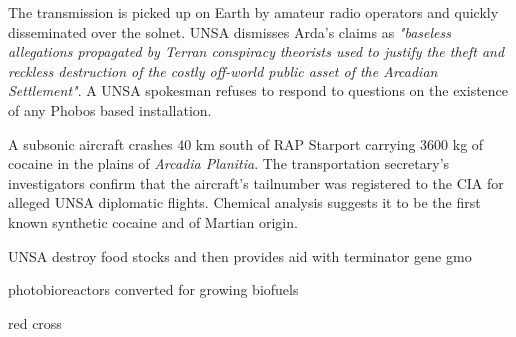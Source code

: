 The transmission is picked up on Earth by amateur radio operators and quickly disseminated over the solnet. UNSA dismisses Arda's claims as {\it "baseless allegations propagated by Terran conspiracy theorists used to justify the theft and reckless destruction of the costly off-world public asset of the Arcadian Settlement"}. A UNSA spokesman refuses to respond to questions on the existence of any Phobos based installation.
\StopTimelineDate

A subsonic aircraft crashes 40 km south of RAP Starport carrying 3600 kg of cocaine in the plains of {\it Arcadia Planitia}. The transportation secretary's investigators confirm that the aircraft's tailnumber was registered to the CIA for alleged UNSA diplomatic flights. Chemical analysis suggests it to be the first known synthetic cocaine and of Martian origin.
\StopTimelineDate

UNSA destroy food stocks and then provides aid with terminator gene gmo

photobioreactors converted for growing biofuels

red cross

\stoplines

\StopChapter

